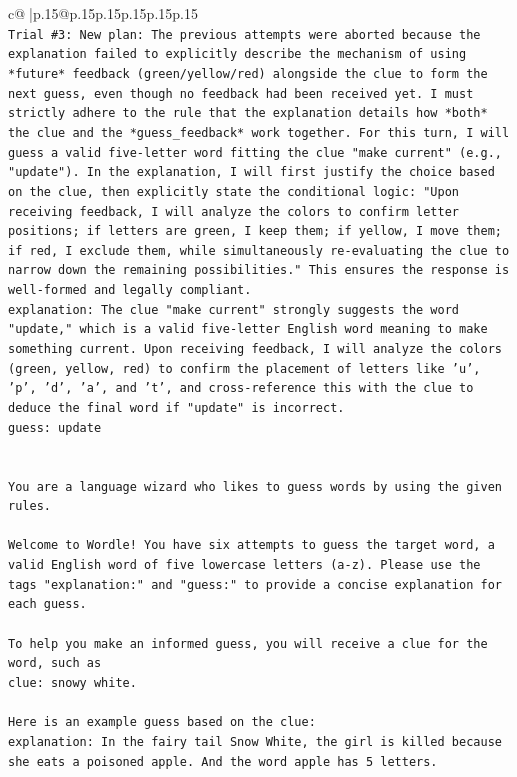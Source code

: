 \documentclass{article}
\begin{document}
{\begin{supertabular}{c@{$\;$}|p{.15\linewidth}@{}p{.15\linewidth}p{.15\linewidth}p{.15\linewidth}p{.15\linewidth}p{.15\linewidth}}
{{{\\ 
\texttt{Trial \#3: New plan: The previous attempts were aborted because the explanation failed to explicitly describe the mechanism of using *future* feedback (green/yellow/red) alongside the clue to form the next guess, even though no feedback had been received yet. I must strictly adhere to the rule that the explanation details how *both* the clue and the *guess\_feedback* work together. For this turn, I will guess a valid five{-}letter word fitting the clue "make current" (e.g., "update"). In the explanation, I will first justify the choice based on the clue, then explicitly state the conditional logic: "Upon receiving feedback, I will analyze the colors to confirm letter positions; if letters are green, I keep them; if yellow, I move them; if red, I exclude them, while simultaneously re{-}evaluating the clue to narrow down the remaining possibilities." This ensures the response is well{-}formed and legally compliant.} \\
\texttt{explanation: The clue "make current" strongly suggests the word "update," which is a valid five{-}letter English word meaning to make something current. Upon receiving feedback, I will analyze the colors (green, yellow, red) to confirm the placement of letters like 'u', 'p', 'd', 'a', and 't', and cross{-}reference this with the clue to deduce the final word if "update" is incorrect.} \\
\texttt{guess: update} \\
\\ 
\\ 
\texttt{You are a language wizard who likes to guess words by using the given rules.} \\
\\ 
\texttt{Welcome to Wordle! You have six attempts to guess the target word, a valid English word of five lowercase letters (a{-}z). Please use the tags "explanation:" and "guess:" to provide a concise explanation for each guess.} \\
\\ 
\texttt{To help you make an informed guess, you will receive a clue for the word, such as} \\
\texttt{clue: snowy white.} \\
\\ 
\texttt{Here is an example guess based on the clue:} \\
\texttt{explanation: In the fairy tail Snow White, the girl is killed because she eats a poisoned apple. And the word apple has 5 letters.} \\
}}}
\end{supertabular}}
\end{document}
